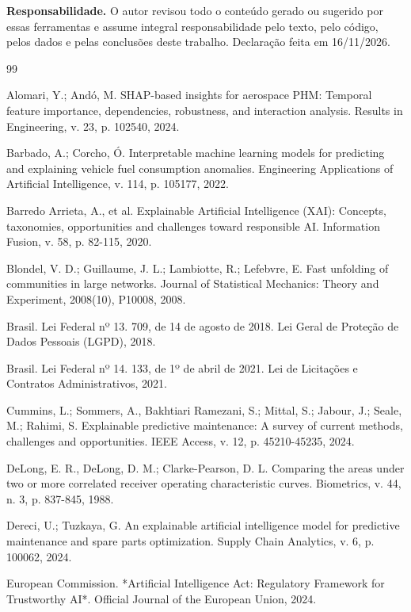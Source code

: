 \documentclass[12pt,a4paper]{article}
\begin{document}
\textbf{Responsabilidade.} O autor revisou todo o conteúdo gerado ou sugerido por essas ferramentas e assume integral responsabilidade pelo texto, pelo código, pelos dados e pelas conclusões deste trabalho. Declaração feita em 16/11/2026.


\begin{thebibliography}{99}

 Alomari, Y.; Andó, M. SHAP-based insights for aerospace PHM: Temporal feature importance, dependencies, robustness, and interaction analysis. Results in Engineering, v. 23, p. 102540, 2024.

 Barbado, A.; Corcho, Ó. Interpretable machine learning models for predicting and explaining vehicle fuel consumption anomalies. Engineering Applications of Artificial Intelligence, v. 114, p. 105177, 2022.

 Barredo Arrieta, A., et al. Explainable Artificial Intelligence (XAI): Concepts, taxonomies, opportunities and challenges toward responsible AI. Information Fusion, v. 58, p. 82-115, 2020.

 Blondel, V. D.; Guillaume, J. L.; Lambiotte, R.; Lefebvre, E. Fast unfolding of communities in large networks. Journal of Statistical Mechanics: Theory and Experiment, 2008(10), P10008, 2008.

 Brasil. Lei Federal nº 13. 709, de 14 de agosto de 2018. Lei Geral de Proteção de Dados Pessoais (LGPD), 2018.

 Brasil. Lei Federal nº 14. 133, de 1º de abril de 2021. Lei de Licitações e Contratos Administrativos, 2021.

 Cummins, L.; Sommers, A., Bakhtiari Ramezani, S.; Mittal, S.; Jabour, J.; Seale, M.; Rahimi, S. Explainable predictive maintenance: A survey of current methods, challenges and opportunities. IEEE Access, v. 12, p. 45210-45235, 2024.

 DeLong, E. R., DeLong, D. M.; Clarke-Pearson, D. L. Comparing the areas under two or more correlated receiver operating characteristic curves. Biometrics, v. 44, n. 3, p. 837-845, 1988.

 Dereci, U.; Tuzkaya, G. An explainable artificial intelligence model for predictive maintenance and spare parts optimization. Supply Chain Analytics, v. 6, p. 100062, 2024.

 European Commission. *Artificial Intelligence Act: Regulatory Framework for Trustworthy AI*. Official Journal of the European Union, 2024.


\end{thebibliography}
\end{document}
